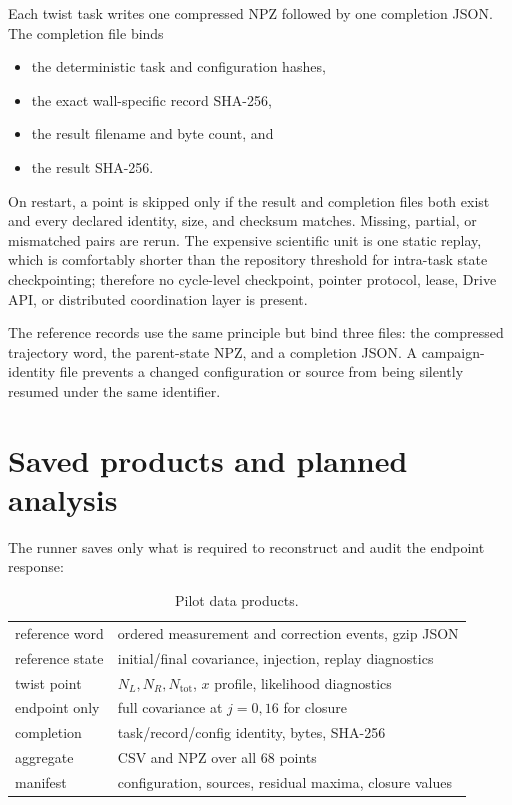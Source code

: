 \documentclass[aps,prb,twocolumn,floatfix,nofootinbib,superscriptaddress]{revtex4-2}
\begin{document}
Each twist task writes one compressed NPZ followed by one completion JSON.  The
completion file binds

\begin{itemize}
  \item the deterministic task and configuration hashes,
  \item the exact wall-specific record SHA-256,
  \item the result filename and byte count, and
  \item the result SHA-256.
\end{itemize}

On restart, a point is skipped only if the result and completion files both
exist and every declared identity, size, and checksum matches.  Missing,
partial, or mismatched pairs are rerun.  The expensive scientific unit is one
static replay, which is comfortably shorter than the repository threshold for
intra-task state checkpointing; therefore no cycle-level checkpoint, pointer
protocol, lease, Drive API, or distributed coordination layer is present.

The reference records use the same principle but bind three files: the
compressed trajectory word, the parent-state NPZ, and a completion JSON.  A
campaign-identity file prevents a changed configuration or source from being
silently resumed under the same identifier.

\section{Saved products and planned analysis}

The runner saves only what is required to reconstruct and audit the endpoint
response:

\begin{table}[b]
\caption{Pilot data products.}
\label{tab:products}
\begin{ruledtabular}
\begin{tabular}{lp{}}
reference word & ordered measurement and correction events, gzip JSON \\
reference state & initial/final covariance, injection, replay diagnostics \\
twist point & $N_L,N_R,N_{\mathrm{tot}}$, $x$ profile, likelihood diagnostics \\
endpoint only & full covariance at $j=0,16$ for closure \\
completion & task/record/config identity, bytes, SHA-256 \\
aggregate & CSV and NPZ over all 68 points \\
manifest & configuration, sources, residual maxima, closure values \\
\end{tabular}
\end{ruledtabular}
\end{table}
\end{document}
